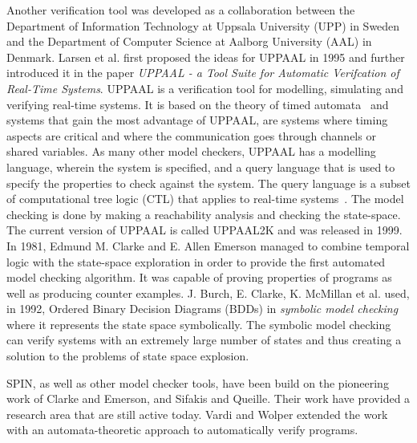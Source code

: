 Another verification tool was developed as a collaboration between the Department of Information Technology at Uppsala University (UPP) in Sweden and the Department of Computer Science at Aalborg University (AAL) in Denmark. Larsen et al. first proposed the ideas for UPPAAL\cite{Larsen1995} in 1995 and further introduced it in the paper \textit{UPPAAL - a Tool Suite for Automatic Verifcation of Real-Time Systems}\cite{Bengtsson1995}.
UPPAAL is a verification tool for modelling, simulating and verifying real-time systems. It is based on the theory of timed automata~\cite{Hopcroft2001}\cite{Alur1990} and systems that gain the most advantage of UPPAAL, are systems where timing aspects are critical and where the communication goes through channels or shared variables.
As many other model checkers, UPPAAL has a modelling language, wherein the system is specified, and a query language that is used to specify the properties to check against the system. The query language is a subset of computational tree logic (CTL) that applies to real-time systems~\cite{Henzinger1994}\cite{Larsen1995}. The model checking is done by making a reachability analysis and checking the state-space. The current version of UPPAAL is called UPPAAL2K and was released in 1999\cite{Amnell2001}.\\

In 1981, Edmund M. Clarke and E. Allen Emerson managed to combine temporal logic with the state-space exploration in order to provide the first automated model checking algorithm\cite{Clarke1981}. It was capable of proving properties of programs as well as producing counter examples.
J. Burch, E. Clarke, K. McMillan et al. used, in 1992, Ordered Binary Decision Diagrams (BDDs) in \textit{symbolic model checking}~\cite{Burch1992} where it represents the state space symbolically. The symbolic model checking can verify systems with an extremely large number of states and thus creating a solution to the problems of state space explosion.

SPIN, as well as other model checker tools, have been build on the pioneering work of Clarke and Emerson\cite{Clarke1981}, and Sifakis and Queille\cite{Queille1982}. Their work have provided a research area that are still active today. Vardi and Wolper extended the work with an automata-theoretic approach to automatically verify programs\cite{Vardi1986}.\\

